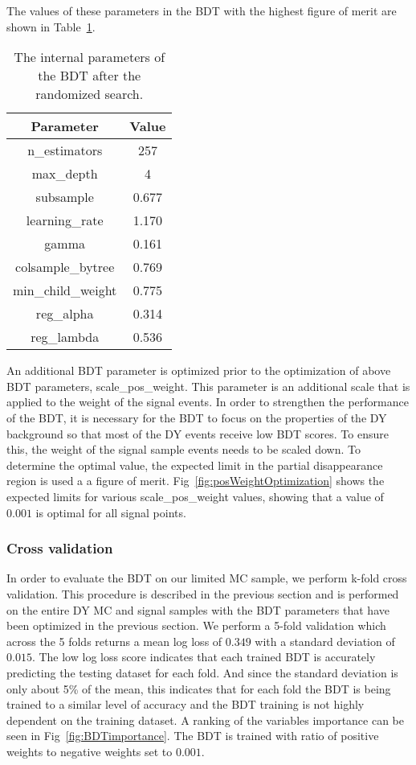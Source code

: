 The values of these parameters in the BDT with the highest figure of merit are shown in Table~\ref{tab:BDTparameters}.
\begin{table}[htbp]
  \caption{
     The internal parameters of the BDT after the randomized search.
  }
  \centering
  \label{tab:BDTparameters}
    \begin{tabular}{ c c }
\hline
Parameter & Value \\
\hline
n\_estimators & 257 \\
max\_depth & 4 \\
subsample & 0.677 \\
learning\_rate & 1.170 \\
gamma & 0.161\\
colsample\_bytree & 0.769 \\
min\_child\_weight & 0.775\\
reg\_alpha & 0.314\\
reg\_lambda & 0.536\\
\hline
    \end{tabular}
\end{table}
An additional BDT parameter is optimized prior to the optimization of above BDT parameters, scale\_pos\_weight. This parameter is an additional scale that is applied to the weight of the signal events.
In order to strengthen the performance of the BDT, it is necessary for the BDT to focus on the properties of the DY background so that most of the DY events receive low BDT scores.
To ensure this, the weight of the signal sample events needs to be scaled down. To determine the optimal value, the expected limit in the partial disappearance region is used a a figure of merit.
Fig~\ref{fig:posWeightOptimization} shows the expected limits for various scale\_pos\_weight values, showing that a value of $0.001$ is optimal for all signal points.
\subsubsection*{Cross validation}

In order to evaluate the BDT on our limited MC sample, we perform k-fold cross validation.
This procedure is described in the previous section and is performed on the entire DY MC and signal samples with the BDT parameters that have been optimized in the previous section.
We perform a 5-fold validation which across the 5 folds returns a mean log loss of $0.349$ with a standard deviation of $0.015$.
The low log loss score indicates that each trained BDT is accurately predicting the testing dataset for each fold.
And since the standard deviation is only about 5\% of the mean, this indicates that for each fold the BDT is being trained to a similar level of accuracy and the BDT training is not highly dependent on the training dataset.
A ranking of the variables importance can be seen in Fig~\ref{fig:BDTimportance}. The BDT is trained with ratio of positive weights to negative weights set to $0.001$.
